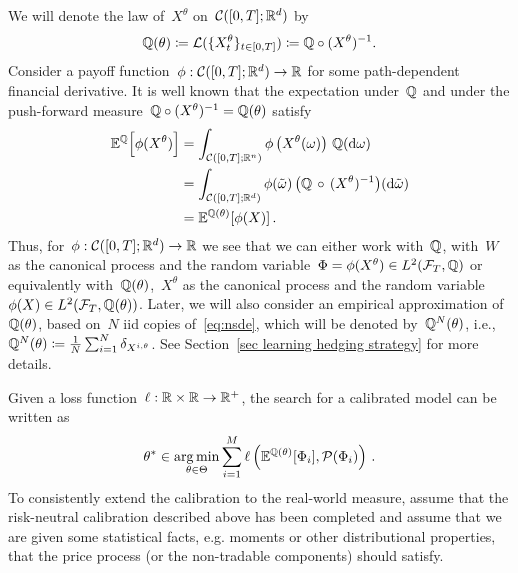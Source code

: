 We will denote the law of~$X^{\theta}$ on~$\mathcal{C}([0,T];\mathbb{R}^d)$ by
$$\mathbb{Q}(\theta) \coloneqq \mathcal{L}(\{X^\theta_t\}_{t\in[0,T]}) \coloneqq \mathbb{Q} \circ (X^\theta)^{-1}.$$ 
Consider a payoff function~${\phi:\mathcal{C}([0, T];\mathbb{R}^d) \to \mathbb{R}}$ for some path-dependent financial derivative. 
It is well known that the expectation under~$\mathbb{Q}$ and under the push-forward measure~$\mathbb{Q} \circ (X^\theta)^{-1} = \mathbb{Q}(\theta)$ satisfy
\begin{align*}
\mathbb{E}^{\mathbb{Q}}\Big[\phi(X^\theta)\Big] &= \int_{\mathcal{C}([0,T];\mathbb{R}^n)} \phi\left(X^\theta(\omega)\right)\,\mathbb{Q}(\mathrm{d}\omega)  \\
&= \int_{\mathcal{C}([0,T];\mathbb{R}^d)} \phi(\tilde \omega)\,\big(\mathbb{Q}\,\circ\, (X^\theta)^{-1}\big)(\mathrm{d}\tilde \omega) \\
&= \mathbb{E}^{\mathbb{Q}(\theta)}[\phi(X)]\,.
\end{align*}
Thus, for~$\phi:\mathcal{C}([0,T];\mathbb{R}^d) \to \mathbb{R}$ we see that we can either work with~$\mathbb{Q}$, with~$W$ as the canonical process and the random variable~$\Phi = \phi(X^\theta)\in L^2(\mathcal{F}_T, \mathbb{Q})$ or equivalently with~$\mathbb{Q}(\theta)$,~$X^\theta$ as the canonical process and the random variable~${\phi(X) \in L^2(\mathcal{F}_T, \mathbb{Q}(\theta))}$.
Later, we will also consider an empirical approximation of~$\mathbb{Q}(\theta)$, based on~$N$ iid copies of~\eqref{eq:nsde}, which will be denoted by~$\mathbb{Q}^N(\theta)$, i.e.,~$\mathbb{Q}^N(\theta)\coloneqq\frac{1}{N} \sum_{i=1}^N \delta_{X^{i, \theta}}$. See Section~\ref{sec learning hedging strategy} for more details.


Given a loss function~$\ell :\mathbb{R} \times \mathbb{R} \to \mathbb{R}^{+}$, the search for a calibrated model can be written as 
\[
\theta^{\ast} \in \operatorname*{arg\,min}_{\theta \in\Theta}\sum_{i=1}^M \ell\left(\mathbb{E}^{\mathbb{Q}(\theta)}[\Phi_i],\mathcal{P}(\Phi_i) \right)\,.
\] 
To consistently extend the calibration to the real-world measure, assume that the risk-neutral calibration described above has been completed and assume that we are given some statistical facts, e.g. moments or other distributional properties, that the price process (or the non-tradable components) should satisfy.

